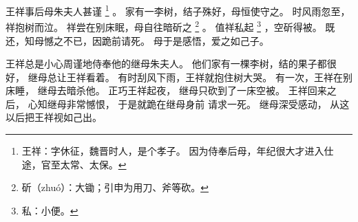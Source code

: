 
\switchcolumn*[\section{}]

王祥事后母朱夫人甚谨%
\footnote{%
    王祥：字休征，魏晋时人，是个孝子。
          因为侍奉后母，年纪很大才进入仕途，官至太常、太保。
}%
。
家有一李树，结子殊好，母恒使守之。
时风雨忽至，祥抱树而泣。
祥尝在别床眠，母自往暗斫之%
\footnote{%
    斫（zhuó）：大锄；引申为用刀、斧等砍。
}%
。
值祥私起%
\footnote{%
    私：小便。
}%
，空斫得被。
既还，知母憾之不已，因跪前请死。
母于是感悟，爱之如己子。

\switchcolumn

王祥总是小心周谨地侍奉他的继母朱夫人。
他们家有一棵李树，结的果子都很好，
继母总让王祥看着。
有时刮风下雨，王祥就抱住树大哭。
有一次，王祥在别床睡，
继母去暗杀他。
正巧王祥起夜，
继母只砍到了一床空被。
王祥回来之后，
心知继母非常憾恨，
于是就跪在继母身前
请求一死。
继母深受感动，
从这以后把王祥视如己出。

